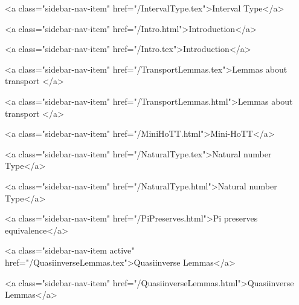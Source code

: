       
        
          <a class="sidebar-nav-item" href="/IntervalType.tex">Interval Type</a>
        
      
    
      
        
          <a class="sidebar-nav-item" href="/Intro.html">Introduction</a>
        
      
    
      
        
          <a class="sidebar-nav-item" href="/Intro.tex">Introduction</a>
        
      
    
      
        
          <a class="sidebar-nav-item" href="/TransportLemmas.tex">Lemmas about transport </a>
        
      
    
      
        
          <a class="sidebar-nav-item" href="/TransportLemmas.html">Lemmas about transport </a>
        
      
    
      
        
          <a class="sidebar-nav-item" href="/MiniHoTT.html">Mini-HoTT</a>
        
      
    
      
        
          <a class="sidebar-nav-item" href="/NaturalType.tex">Natural number Type</a>
        
      
    
      
        
          <a class="sidebar-nav-item" href="/NaturalType.html">Natural number Type</a>
        
      
    
      
        
          <a class="sidebar-nav-item" href="/PiPreserves.html">Pi preserves equivalence</a>
        
      
    
      
        
          <a class="sidebar-nav-item active" href="/QuasiinverseLemmas.tex">Quasiinverse Lemmas</a>
        
      
    
      
        
          <a class="sidebar-nav-item" href="/QuasiinverseLemmas.html">Quasiinverse Lemmas</a>
        
